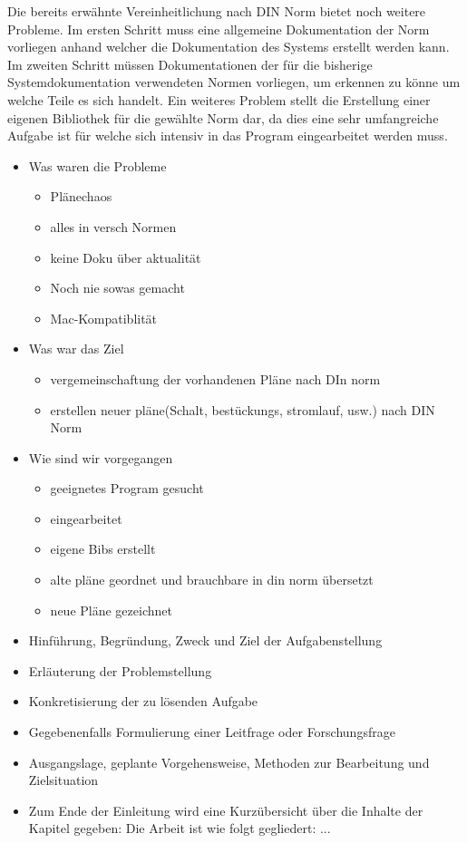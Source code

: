   Die bereits erwähnte Vereinheitlichung nach DIN Norm bietet noch weitere Probleme. Im ersten Schritt muss eine allgemeine Dokumentation der Norm vorliegen anhand welcher die Dokumentation des Systems erstellt werden kann. Im zweiten Schritt müssen Dokumentationen der für die bisherige Systemdokumentation verwendeten Normen vorliegen, um erkennen zu könne um welche Teile es sich handelt. Ein weiteres Problem stellt die Erstellung einer eigenen Bibliothek für die gewählte Norm dar, da dies eine sehr umfangreiche Aufgabe ist für welche sich intensiv in das Program eingearbeitet werden muss.

\begin{itemize}
	\item Was waren die Probleme
		\begin{itemize}
		\item Plänechaos
		\item alles in versch Normen
		\item keine Doku über aktualität
		\item Noch nie sowas gemacht
		\item Mac-Kompatiblität
	\end{itemize}
	\item Was war das Ziel
			\begin{itemize}
		\item vergemeinschaftung der vorhandenen Pläne nach DIn norm
		\item erstellen neuer pläne(Schalt, bestückungs, stromlauf, usw.) nach DIN Norm
	\end{itemize}
	\item Wie sind wir vorgegangen
		\begin{itemize}
		\item geeignetes Program gesucht
		\item eingearbeitet
		\item eigene Bibs erstellt
		\item alte pläne geordnet und brauchbare in din norm übersetzt
		\item neue Pläne gezeichnet
	\end{itemize}
\end{itemize}

\begin{itemize}
\item Hinführung, Begründung, Zweck und Ziel der Aufgabenstellung
\item Erläuterung der Problemstellung
\item Konkretisierung der zu lösenden Aufgabe
\item Gegebenenfalls Formulierung einer Leitfrage oder Forschungsfrage
\item Ausgangslage, geplante Vorgehensweise, Methoden zur Bearbeitung und Zielsituation
\item Zum Ende der Einleitung wird eine Kurzübersicht über die Inhalte der Kapitel gegeben: \glqq Die Arbeit ist wie folgt gegliedert: ...\grqq
\end{itemize}





	
